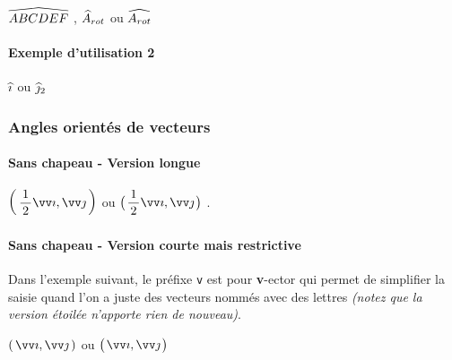 \documentclass[12pt,a4paper]{article}
\theoremstyle{definition}
\begin{document}
\begin{latexex}
$\anglein{ABCDEF}$ ,
$\anglein*{A}{rot}$ ou
$\anglein{A_{rot}}$
\end{latexex}




\paragraph{Exemple d'utilisation 2}

\begin{latexex}
$\anglein{i}$ ou
$\anglein*{j}{2}$
\end{latexex}




\subsubsection{Angles orientés de vecteurs}

\paragraph{Sans chapeau - Version longue}

\begin{latexex}
$\displaystyle
 \angleorient{\frac{1}{2} \vect{i}}%
             {\vect{j}}$
ou
$\displaystyle
 \angleorient*{\frac{1}{2} \vect{i}}%
              {\vect{j}}$ .
\end{latexex}




\paragraph{Sans chapeau - Version courte mais restrictive}

Dans l'exemple suivant, le préfixe \verb+v+ est pour \textbf{v}-ector qui permet de simplifier la saisie quand l'on a juste des vecteurs nommés avec des lettres
\emph{(notez que la version étoilée n'apporte rien de nouveau)}.

\begin{latexex}
$\vangleorient{i}{j}$
ou
$\vangleorient*{i}{j}$
\end{latexex}
\end{document}
